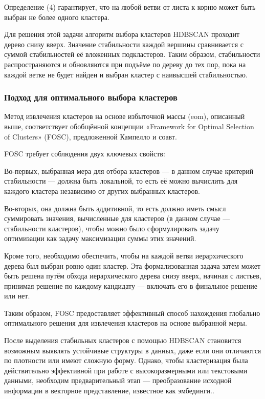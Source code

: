  Определение (4) гарантирует, что на любой ветви от листа к корню может быть выбран не более одного кластера.

Для решения этой задачи алгоритм выбора кластеров HDBSCAN проходит дерево снизу вверх. Значение стабильности каждой вершины сравнивается с суммой стабильностей её вложенных подкластеров. Таким образом, стабильности распространяются и обновляются при подъёме по дереву до тех пор, пока на каждой ветке не будет найден и выбран кластер с наивысшей стабильностью.
\subsubsection{Подход для оптимального выбора кластеров}

Метод извлечения кластеров на основе избыточной массы (eom), описанный выше, соответствует обобщённой концепции «Framework for Optimal Selection of Clusters» (FOSC), предложенной Кампелло и соавт.

FOSC требует соблюдения двух ключевых свойств:

Во-первых, выбранная мера для отбора кластеров — в данном случае критерий стабильности — должна быть локальной, то есть её можно вычислить для каждого кластера независимо от других выбранных кластеров.

Во-вторых, она должна быть аддитивной, то есть должно иметь смысл суммировать значения, вычисленные для кластеров (в данном случае — стабильности кластеров), чтобы можно было сформулировать задачу оптимизации как задачу максимизации суммы этих значений.

Кроме того, необходимо обеспечить, чтобы на каждой ветви иерархического дерева был выбран ровно один кластер. Эта формализованная задача затем может быть решена путём обхода иерархического дерева снизу вверх, начиная с листьев, принимая решение по каждому кандидату — включать его в финальное решение или нет.

Таким образом, FOSC предоставляет эффективный способ нахождения глобально оптимального решения для извлечения кластеров на основе выбранной меры.

После выделения стабильных кластеров с помощью HDBSCAN становится возможным выявлять устойчивые структуры в данных, даже если они отличаются по плотности или имеют сложную форму. Однако, чтобы кластеризация была действительно эффективной при работе с высокоразмерными или текстовыми данными, необходим предварительный этап — преобразование исходной информации в векторное представление, известное как эмбединги..

